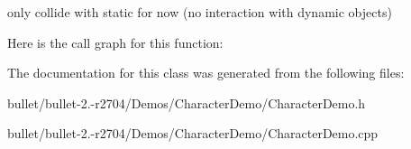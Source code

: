 only collide with static for now (no interaction with dynamic objects) 

Here is the call graph for this function\+:




The documentation for this class was generated from the following files\+:\begin{DoxyCompactItemize}
\item 
bullet/bullet-\/2.-\/r2704/\+Demos/\+Character\+Demo/Character\+Demo.\+h\item 
bullet/bullet-\/2.-\/r2704/\+Demos/\+Character\+Demo/Character\+Demo.\+cpp\end{DoxyCompactItemize}
